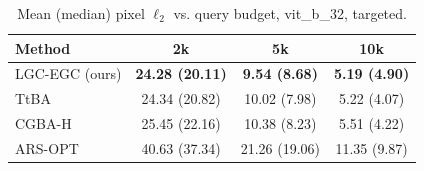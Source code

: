 \begin{table}[t]
\centering\footnotesize
\caption{Mean (median) pixel $\ell_2$ vs. query budget, vit\_b\_32, targeted.}
\begin{tabular}{lccc}
\toprule
Method & 2k & 5k & 10k \\
\midrule
LGC-EGC (ours) & \textbf{24.28 (20.11)} & \textbf{9.54 (8.68)} & \textbf{5.19 (4.90)} \\
TtBA & 24.34 (20.82) & 10.02 (7.98) & 5.22 (4.07) \\
CGBA-H & 25.45 (22.16) & 10.38 (8.23) & 5.51 (4.22) \\
ARS-OPT & 40.63 (37.34) & 21.26 (19.06) & 11.35 (9.87) \\
\bottomrule
\end{tabular}
\end{table}
